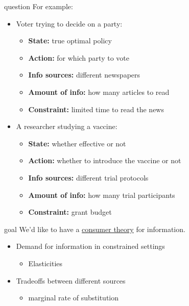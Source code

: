\documentclass[square,]{gBakerBeamer}
\renewcommand{\|}{\,|\,}
\begin{document}
\begin{frame}{question}
  For example:
  \begin{itemize}
    \item Voter trying to decide on a party:
          \begin{itemize}
            \item \alert<1>{\textbf{State:} true optimal policy}
            \item \alert<2>{\textbf{Action:} for which party to vote}
            \item \alert<3>{\textbf{Info sources:} different newspapers}
            \item \alert<4>{\textbf{Amount of info:} how many articles to read}
            \item \alert<5>{\textbf{Constraint:} limited time to read the news}
          \end{itemize}\vspace{\baselineskip}

    \item<6-> A researcher studying a vaccine:
          \begin{itemize}
            \item<2-> \textbf{State:} whether effective or not
            \item<2-> \textbf{Action:} whether to introduce the vaccine or not
            \item<2-> \textbf{Info sources:} different trial protocols
            \item<2-> \textbf{Amount of info:} how many trial participants
            \item<2-> \textbf{Constraint:} grant budget
          \end{itemize}
  \end{itemize}

\end{frame}


\begin{frame}{goal}
  We'd like to have a \ul{consumer theory} for information.\bigskip
  \begin{itemize}
    \item<1-> Demand for information in constrained settings
          \begin{itemize}
            \item<1-> Elasticities
          \end{itemize}\bigskip
    \item<2-> Tradeoffs between different sources
          \begin{itemize}
            \item<2-> marginal rate of substitution
          \end{itemize}
  \end{itemize}
\end{frame}
\end{document}
